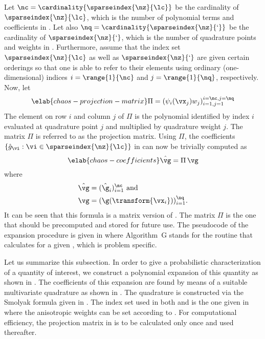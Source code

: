 Let $\nc = \cardinality{\sparseindex{\nz}{\lc}}$ be the cardinality of
$\sparseindex{\nz}{\lc}$, which is the number of polynomial terms and
coefficients in . Let also $\nq =
\cardinality{\sparseindex{\nz}{\lq}}$ be the cardinality of
$\sparseindex{\nz}{\lq}$, which is the number of quadrature points and weights
in . Furthermore, assume that the index set
$\sparseindex{\nz}{\lc}$ as well as $\sparseindex{\nz}{\lq}$ are given certain
orderings so that one is able to refer to their elements using ordinary
(one-dimensional) indices $i = \range{1}{\nc}$ and $j = \range{1}{\nq}$,
respectively. Now, let
\begin{equation} \elab{chaos-projection-matrix}
  \Pi = (\psi_i(\vx_j) w_j)_{i = 1, j = 1}^{i = \nc, j = \nq}
\end{equation}
The element on row $i$ and column $j$ of $\Pi$ is the polynomial identified by
index $i$ evaluated at quadrature point $j$ and multiplied by quadrature weight
$j$. The matrix $\Pi$ is referred to as the projection matrix. Using $\Pi$, the
coefficients $\{ \hat{g}_{\vi}: \vi \in \sparseindex{\nz}{\lc} \}$ in
 can now be trivially computed as
\begin{equation} \elab{chaos-coefficients}
  \hat{\vg} = \Pi \, \vg
\end{equation}
where
\begin{align*}
  & \hat{\vg} = (\hat{\g}_i)_{i = 1}^\nc \text{ and} \\
  & \vg = (\g(\transform{\vx_i}))_{i = 1}^\nq.
\end{align*}
It can be seen that this formula is a matrix version of
. The matrix $\Pi$ is the one that should be precomputed
and stored for future use. The pseudocode of the expansion procedure is given in
 where Algorithm~G stands for the routine that calculates
\g for a given \vu, which is problem specific.

Let us summarize this subsection. In order to give a probabilistic
characterization of a quantity of interest, we construct a polynomial expansion
of this quantity as shown in . The coefficients of this
expansion are found by means of a suitable multivariate quadrature as shown in
. The quadrature is constructed via the Smolyak formula
given in . The index set used in both
 and  is the one given in
 where the anisotropic weights can be set
according to . For computational efficiency, the
projection matrix in  is to be calculated only
once and used thereafter.

